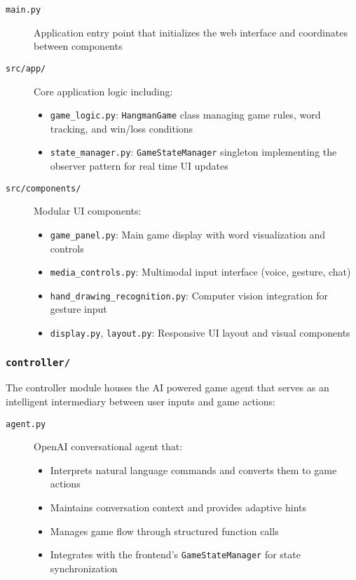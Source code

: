\begin{description}
\item[\texttt{main.py}] Application entry point that initializes the web interface and coordinates between components
\item[\texttt{src/app/}] Core application logic including:
  \begin{itemize}
    \item \texttt{game\_logic.py}: \texttt{HangmanGame} class managing game rules, word tracking, and win/loss conditions
    \item \texttt{state\_manager.py}: \texttt{GameStateManager} singleton implementing the observer pattern for real time UI updates
  \end{itemize}
\item[\texttt{src/components/}] Modular UI components:
  \begin{itemize}
    \item \texttt{game\_panel.py}: Main game display with word visualization and controls
    \item \texttt{media\_controls.py}: Multimodal input interface (voice, gesture, chat)
    \item \texttt{hand\_drawing\_recognition.py}: Computer vision integration for gesture input
    \item \texttt{display.py}, \texttt{layout.py}: Responsive UI layout and visual components
  \end{itemize}
\end{description}

\subsubsection*{\texttt{controller/}}
The controller module houses the AI powered game agent that serves as an intelligent intermediary between user inputs and game actions:

\begin{description}
\item[\texttt{agent.py}] OpenAI conversational agent that:
  \begin{itemize}
    \item Interprets natural language commands and converts them to game actions
    \item Maintains conversation context and provides adaptive hints
    \item Manages game flow through structured function calls
    \item Integrates with the frontend's \texttt{GameStateManager} for state synchronization
  \end{itemize}
\end{description}

